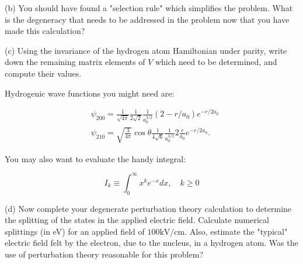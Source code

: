 \documentclass[12pt]{article}
\begin{document}
(b) You should have found a "selection rule" which simplifies the problem. What is the degeneracy that needs to be addressed in the problem now that you have made this calculation?

(c) Using the invariance of the hydrogen atom Hamiltonian under parity, write down the remaining matrix elements of $V$ which need to be determined, and compute their values.

Hydrogenic wave functions you might need are:

$$
\begin{aligned}
& \psi_{200}=\frac{1}{\sqrt{4 \pi}} \frac{1}{2 \sqrt{2}} \frac{1}{a_{0}^{3 / 2}}\left(2-r / a_{0}\right) e^{-r / 2 a_{0}} \\
& \psi_{210}=\sqrt{\frac{3}{4 \pi}} \cos \theta \frac{1}{4 \sqrt{6}} \frac{1}{a_{0}^{3 / 2}} 2 \frac{r}{a_{0}} e^{-r / 2 a_{0}} .
\end{aligned}
$$

You may also want to evaluate the handy integral:

$$
I_{k} \equiv \int_{0}^{\infty} x^{k} e^{-x} d x, \quad k \geq 0
$$

(d) Now complete your degenerate perturbation theory calculation to determine the splitting of the states in the applied electric field. Calculate numerical splittings (in eV) for an applied field of $100 \mathrm{kV} / \mathrm{cm}$. Also, estimate the "typical" electric field felt by the electron, due to the nucleus, in a hydrogen atom. Was the use of perturbation theory reasonable for this problem?
\end{document}
